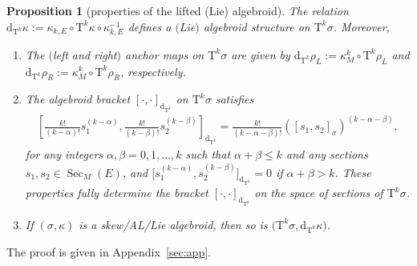 \documentclass[pdftex]{sigma}
\newcommand{\Sec}{\operatorname{Sec}}
\newcommand{\dd}{\mathrm{d}}
\newcommand{\rhoL}{\rho_L} %
\newcommand{\rhoR}{\rho_R}
\newcommand{\TT}[1]{\mathrm{T}^{#1}} %
\numberwithin{equation}{section}
\newtheorem{prop}[thm]{Proposition}
\theoremstyle{definition}
\begin{document}
\begin{prop}[properties of the lifted (Lie) algebroid]\label{p:algebroid_Tk_E} The relation $\dd_{\TT{k}}\kappa:=\kappa_{k, E}\circ\TT{k} \kappa\circ\kappa_{k, E}^{-1}$ defines a $($Lie$)$ algebroid structure on $\TT{k}\sigma$. Moreover,
\begin{enumerate}[$(i)$]\itemsep=0pt
\item The $($left and right$)$ anchor maps on $\TT{k} \sigma$ are given by $\dd_{\TT{k}}\rhoL:=\kappa^k_M\circ\TT{k}\rhoL$ and $\dd_{\TT{k}}\rhoR:=\kappa^k_M\circ\TT{k}\rhoR$, respectively.
\item \label{p:algebroid_Tk_E_item_bracket} The algebroid bracket $[\cdot,\cdot]_{\dd_{\TT{k}}}$ on $\TT{k}\sigma$ satisfies
\begin{gather}\label{p:algebroid_Tk_E_item_bracket_formula}
\left[ \frac{k!}{(k-\alpha)!} s_1^{(k-\alpha)}, \frac{k!}{(k-\beta)!} s_2^{(k-\beta)}\right]_{\dd_{\TT{k}}} = \frac{k!}{(k-\alpha-\beta)!} ([s_1, s_2]_{\sigma})^{(k-\alpha-\beta)},
\end{gather}
for any integers $\alpha,\beta=0,1,\hdots,k$ such that $\alpha + \beta \leq k$ and any sections $s_1,s_2\in\Sec_M(E)$, and $\big[s_1^{(k-\alpha)}, s_2^{(k-\beta)}\big]_{\dd_{\TT{k}}} = 0$ if $\alpha+\beta>k$. These properties fully determine the bracket $[\cdot,\cdot]_{\dd_{\TT{k}}}$ on the space of sections of $\TT{k}\sigma$.
\item \label{p:algebroid_Tk_E_item_Tk_E_is_Lie} If $(\sigma,\kappa)$ is a skew/AL/Lie algebroid, then so is $\big(\TT{k} \sigma,\dd_{\TT{k}}\kappa\big)$.
\end{enumerate}
\end{prop}
The proof is given in Appendix~\ref{sec:app}.
\end{document}
